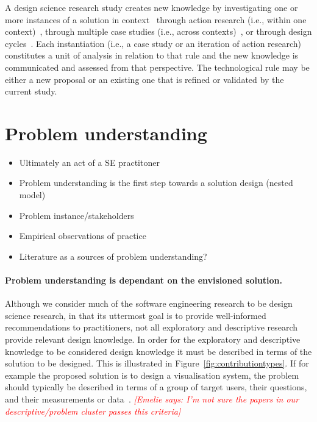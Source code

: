 \documentclass[graybox]{svmult}
\newcommand{\emelie}[1]{\textcolor{red}{{\it [Emelie says: #1]}}}
\newcommand{\emelie}[1]{}
\begin{document}
A design science research study creates new knowledge by investigating one or more instances of a solution in context~\cite{wieringa_what_2014} through action research (i.e., within one context)~\cite{wieringa_technical_2012}, through multiple case studies (i.e., across contexts)~\cite{aken_management_2004}, or through design cycles~\cite{gregor_positioning_2013}. Each instantiation (i.e., a case study or an iteration of action research) constitutes a unit of analysis in relation to that rule and the new knowledge is communicated and assessed from that perspective. 
The technological rule may be either a new proposal or an existing one that is refined or validated by the current study. 

\section{Problem understanding}
\begin{itemize}
\item Ultimately an act of a SE practitoner
\item Problem understanding is the first step towards a solution design (nested model)
\item Problem instance/stakeholders 
\item Empirical observations of practice
\item Literature as a sources of problem understanding?
\end{itemize}


\paragraph{Problem understanding is dependant on the envisioned solution.}Although we consider much of the software engineering research to be design science research, in that its uttermost goal is to provide well-informed recommendations to practitioners, not all exploratory and descriptive research provide relevant design knowledge. In order for the exploratory and descriptive knowledge to be considered design knowledge it must be described in terms of the solution to be designed. This is illustrated in Figure~\ref{fig:contributiontypes}. If for example the proposed solution is to design a visualisation system, the problem should typically be described in terms of a group of target users, their questions, and their measurements or data~\cite{meyer_nested_2015}. \emelie{I'm not sure the papers in our descriptive/problem cluster passes this criteria}
\end{document}
